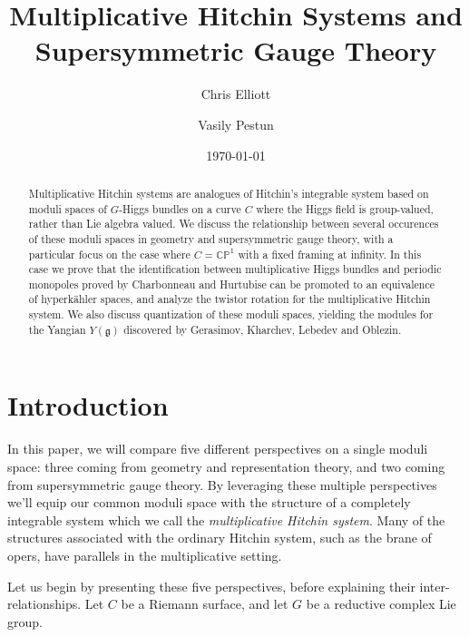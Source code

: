 \documentclass[11pt, oneside, reqno]{amsart}
\title{Multiplicative Hitchin Systems and Supersymmetric Gauge Theory}
\author{Chris Elliott \and Vasily Pestun}
\date{\today}
\theoremstyle{definition} \newtheorem{definition}{Definition}[section]
\theoremstyle{definition} \newtheorem{remark}[definition]{Remark}
\theoremstyle{definition} \newtheorem{remarks}[definition]{Remarks}
\theoremstyle{definition} \newtheorem{question}[definition]{Question}
\theoremstyle{definition} \newtheorem*{note}{Note}
\theoremstyle{definition} \newtheorem{example}[definition]{Example}
\theoremstyle{definition} \newtheorem{examples}[definition]{Examples}
\renewcommand{\gg}{\mathfrak{g}}
\newcommand{\bb}[1]{\mathbb{#1}}
\begin{document}
\maketitle 
\begin{abstract}
Multiplicative Hitchin systems are analogues of Hitchin's integrable system based on moduli spaces of $G$-Higgs bundles on a curve $C$ where the Higgs field is group-valued, rather than Lie algebra valued.  We discuss the relationship between several occurences of these moduli spaces in geometry and supersymmetric gauge theory, with a particular focus on the case where $C = \bb{CP}^1$ with a fixed framing at infinity.  In this case we prove that the identification between multiplicative Higgs bundles and periodic monopoles proved by Charbonneau and Hurtubise can be promoted to an equivalence of hyperk\"ahler spaces, and analyze the twistor rotation for the multiplicative Hitchin system.  We also discuss quantization of these moduli spaces, yielding the modules for the Yangian $Y(\gg)$ discovered by Gerasimov, Kharchev, Lebedev and Oblezin.
\end{abstract}

\section{Introduction}
In this paper, we will compare five different perspectives on a single moduli space: three coming from geometry and representation theory, and two coming from supersymmetric gauge theory.  By leveraging these multiple perspectives we'll equip our common moduli space with the structure of a completely integrable system which we call the \emph{multiplicative Hitchin system}.  Many of the structures associated with the ordinary Hitchin system, such as the brane of opers, have parallels in the multiplicative setting.  

Let us begin by presenting these five perspectives, before explaining their inter-relationships.  Let $C$ be a Riemann surface, and let $G$ be a reductive complex Lie group.
\end{document}
